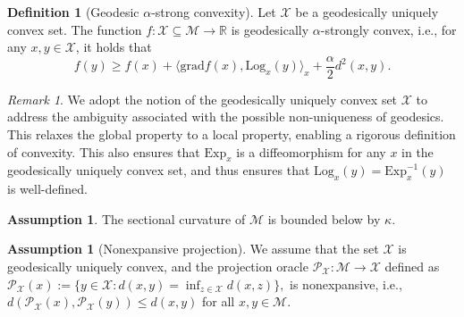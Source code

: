 \documentclass{article}
\newcommand{\rgrad}{\mathrm{grad}}
\newcommand{\Log}{\mathrm{Log}}
\theoremstyle{plain}
\theoremstyle{definition}
\newtheorem{definition}[theorem]{Definition}
\newtheorem{assumption}[theorem]{Assumption}
\theoremstyle{remark}
\newtheorem{remark}[theorem]{Remark}
\begin{document}
\begin{definition}[Geodesic $\alpha$-strong convexity]\label{as:strongcon}
Let $\mathcal{X}$ be a geodesically uniquely convex set. The function $f : \mathcal{X}\subseteq\mathcal{M} \to \mathbb{R}$ is geodesically $\alpha$-strongly convex, i.e., for any $x, y \in \mathcal{X}$, it holds that
\begin{equation*}
f(y) \geq f(x) + \langle \rgrad f(x), \Log_x(y) \rangle_x + \frac{\alpha}{2} d^2(x, y).
\end{equation*}
\end{definition}
\fi
\begin{remark}
We adopt the notion of the geodesically uniquely convex set $\mathcal{X}$ \citep{pmlr-v162-kim22k} to address the ambiguity associated with the possible non-uniqueness of geodesics. 
This relaxes the global property to a local property, enabling a rigorous definition of convexity. This also ensures that $\mathrm{Exp}_x$ is a diffeomorphism for any $x$ in the geodesically uniquely convex set, and thus ensures that $\Log_x(y)=\mathrm{Exp}^{-1}_x(y)$ is well-defined. 


\begin{assumption}\label{as:curvature_lb}
The sectional curvature of $\mathcal{M}$ is bounded below by $\kappa$.
\end{assumption}

\begin{assumption}[Nonexpansive projection]\label{as:proj}
We assume that the set $\mathcal{X}$ is geodesically uniquely convex, and the projection oracle $\mathcal{P}_{\mathcal{X}}:\mathcal{M}\rightarrow \mathcal{X}$ defined as
$
\mathcal{P}_{\mathcal{X}}(x) := \{ y \in \mathcal{X} : d(x, y) = \inf_{z \in \mathcal{X}} d(x, z) \},
$ is nonexpansive, i.e., $d(\mathcal{P}_{\mathcal{X}}(x), \mathcal{P}_{\mathcal{X}}(y)) \leq d(x, y)$ for all $x,y\in\mathcal{M}$. 
\end{assumption}
\end{remark}
\end{document}
